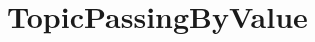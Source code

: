 \hypertarget{group___topic_passing_by_value}{}\section{Topic\+Passing\+By\+Value}
\label{group___topic_passing_by_value}
